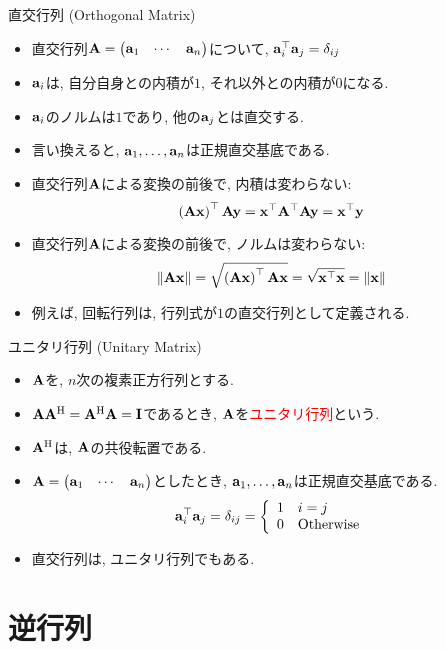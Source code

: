 \documentclass[dvipdfmx,notheorems,t]{beamer}
\begin{document}
\begin{frame}{直交行列 (Orthogonal Matrix)}
\begin{itemize}
  \item 直交行列$\vb{A} = \mqty(\vb{a}_1 & \cdots & \vb{a}_n)$について,
  $\vb{a}_i^\top \vb{a}_j = \delta_{ij}$
  \item $\vb{a}_i$は, 自分自身との内積が$1$, それ以外との内積が$0$になる.
  \item $\vb{a}_i$のノルムは$1$であり, 他の$\vb{a}_j$とは直交する.
  \item 言い換えると, $\vb{a}_1, \ldots, \vb{a}_n$は正規直交基底である.
  \item 直交行列$\vb{A}$による変換の前後で, 内積は変わらない:
  $$\left( \vb{A} \vb{x} \right)^\top \vb{A} \vb{y}
    = \vb{x}^\top \vb{A}^\top \vb{A} \vb{y} = \vb{x}^\top \vb{y}$$
  \item 直交行列$\vb{A}$による変換の前後で, ノルムは変わらない:
  $$\left\| \vb{A} \vb{x} \right\| = \sqrt{\left( \vb{A} \vb{x} \right)^\top \vb{A} \vb{x}}
    = \sqrt{\vb{x}^\top \vb{x}} = \left\| \vb{x} \right\|$$
  \item 例えば, 回転行列は, 行列式が$1$の直交行列として定義される.
\end{itemize}
\end{frame}

\begin{frame}{ユニタリ行列 (Unitary Matrix)}
\begin{itemize}
  \item $\vb{A}$を, $n$次の複素正方行列とする.
  \item $\vb{A} \vb{A}^\mathrm{H} = \vb{A}^\mathrm{H} \vb{A} = \vb{I}$であるとき,
  $\vb{A}$を\textcolor{red}{ユニタリ行列}という.
  \item $\vb{A}^\mathrm{H}$は, $\vb{A}$の共役転置である.
  \item $\vb{A} = \mqty(\vb{a}_1 & \cdots & \vb{a}_n)$としたとき,
  $\vb{a}_1, \ldots, \vb{a}_n$は正規直交基底である.
  $$\vb{a}_i^\top \vb{a}_j = \delta_{ij} = \left\{ \begin{array}{ll}
    1 & i = j \\ 0 & \text{Otherwise} \end{array} \right.$$
  \item 直交行列は, ユニタリ行列でもある.
\end{itemize}
\end{frame}

\section{逆行列}
\end{document}

